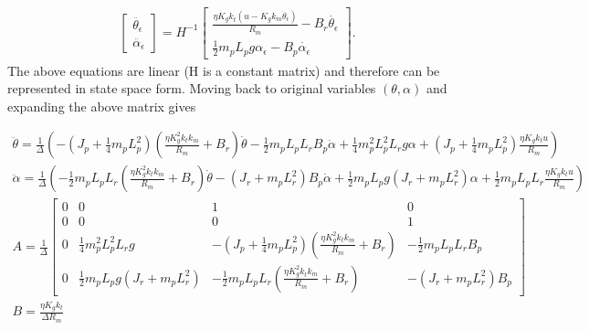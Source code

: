 \documentclass[superscriptaddress,floatfix,reprint,amssymb, amsmath,aps, pre]{revtex4-1}
\newcommand{\aee}{\alpha_\epsilon}
\newcommand{\tee}{\theta_\epsilon}
\begin{document}
{{\begin{gather}
            \left[\begin{array}{l}
                \ddot{\tee} \\
                \ddot{\aee}
                \end{array}\right]=H^{-1}\left[\begin{array}{c}
                \frac{\eta K_g k_t(u - K_g k_m \dot \tee)}{R_m}-B_{r} \dot{\tee} \\
                \frac{1}{2} m_{p} L_{p} g \aee-B_{p} \dot{\aee}
                \end{array}\right].
        \end{gather}
        The above equations are linear (H is a constant matrix) and therefore can be represented in state space form. Moving back to original variables \((\theta,\alpha)\) and expanding the above matrix gives 
        \begin{widetext}
            \begin{gather}
                \ddot \theta = \frac{1}{\Delta} \left(-\left(J_{p}+\frac{1}{4} m_{p} L_{p}^{2}\right)\left(\frac{\eta K_g^2 k_t k_m}{R_m}+B_{r}\right)  \dot{\theta}-\frac{1}{2} m_{p} L_{p} L_{r} B_{p} \dot{\alpha}+\frac{1}{4} m_{p}^{2} L_{p}^{2} L_{r} g \alpha+\left(J_{p}+\frac{1}{4} m_{p} L_{p}^{2}\right) \frac{\eta K_g k_t u}{R_m}\right) \\
                \ddot{\alpha}=\frac{1}{\Delta}\left(-\frac{1}{2} m_{p} L_{p} L_{r} \left(\frac{\eta K_g^2 k_t k_m}{R_m}+B_{r}\right) \dot{\theta}-\left(J_{r}+m_{p} L_{r}^{2}\right) B_{p} \dot{\alpha}+\frac{1}{2} m_{p} L_{p} g\left(J_{r}+m_{p} L_{r}^{2}\right) \alpha+\frac{1}{2} m_{p} L_{p} L_{r} \frac{\eta K_g k_t u}{R_m}\right) \\
                A = \frac{1}{\Delta}\begin{bmatrix}
                    0 & 0 & 1 & 0 \\
                    0 & 0 & 0 & 1 \\
                    0 & \frac{1}{4} m_{p}^{2} L_{p}^{2} L_{r} g & -\left(J_{p}+\frac{1}{4} m_{p} L_{p}^{2}\right)\left(\frac{\eta K_{g}^{2} k_{t} k_{m}}{R_{m}}+B_{r}\right) & -\frac{1}{2} m_{p} L_{p} L_{r} B_{p} \\
                    0 & \frac{1}{2} m_{p} L_{p} g\left(J_{r}+m_{p} L_{r}^{2}\right) & -\frac{1}{2} m_{p} L_{p} L_{r}\left(\frac{\eta K_{g}^{2} k_{t} k_{m}}{R_{m}}+B_{r}\right) & -\left(J_{r}+m_{p} L_{r}^{2}\right) B_{p}
                \end{bmatrix} \\
                B = \frac{\eta K_g k_t}{\Delta R_m}

\end{gather}
\end{widetext}}}
\end{document}
